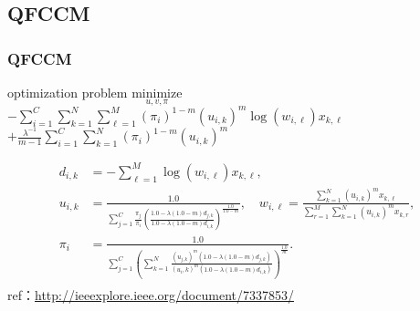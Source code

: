 \documentclass[fleqn,dvipdfmx,10pt]{beamer}
\begin{document}
\subsection{QFCCM}
\begin{frame}\frametitle{QFCCM}%
  \begin{block}{optimization problem}
    $\underset{u,v,\pi}{\text{minimize}}$
    $-\sum_{i=1}^C\sum_{k=1}^N\sum_{\ell=1}^M(\pi_i)^{1-m}(u_{i,k})^m\log(w_{i,\ell})x_{k,\ell}$\\
    $+\frac{\lambda^{-1}}{m-1}\sum_{i=1}^C\sum_{k=1}^N (\pi_i)^{1-m}(u_{i,k})^m$\centering\\
  \end{block}
  \begin{align*}
    d_{i,k}&=-\sum_{\ell=1}^M\log(w_{i,\ell})x_{k,\ell},\\
    u_{i,k}&=\frac{1.0}{\sum_{j=1}^C\frac{\pi_{j}}{\pi_{i}}\left(\frac{1.0-\lambda(1.0-m)d_{j,k}}{1.0-\lambda(1.0-m)d_{i,k}}\right)^{\frac{1.0}{1.0-m}}},\quad
    w_{i,\ell}=\frac{\sum_{k=1}^N (u_{i,k})^m x_{k,\ell}}{\sum_{r=1}^M\sum_{k=1}^N(u_{i,k})^m x_{k,r}},\\
    \pi_{i}&=\frac{1.0}{\sum_{j=1}^C\left(\sum_{k=1}^N\frac{(u_{j,k})^m(1.0-\lambda(1.0-m)d_{j,k})}{(u_i,k)^m(1.0-\lambda(1.0-m)d_{i,k})}\right)^{\frac{1.0}{m}}}.\\
  \end{align*}
  ref：\url{http://ieeexplore.ieee.org/document/7337853/}\centering
\end{frame}
\end{document}
